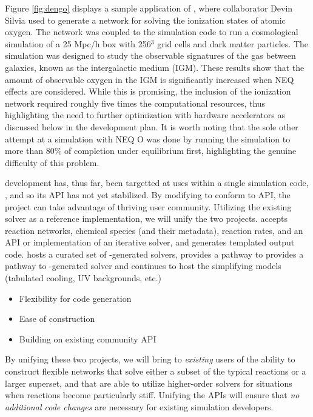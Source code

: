 Figure \ref{fig:dengo} displays a sample application of \dengo{}, where
collaborator Devin Silvia used \dengo{} to generate a network for solving
the ionization states of atomic oxygen.  The network was coupled to
the \enzo{} simulation code to run a cosmological simulation of a 25
Mpc/h box with 256$^{3}$ grid cells and dark matter particles.  The
simulation was designed to study the observable signatures of the gas
between galaxies, known as the intergalactic medium (IGM).  These
results show that the amount of observable oxygen in the IGM is
significantly increased when NEQ effects are considered.
While this is promising, the inclusion of the ionization network
required roughly five times the computational resources, thus
highlighting the need to further optimization with hardware
accelerators as discussed below in the development plan.  It is worth
noting that the sole other attempt at a simulation with NEQ
O \citep{2016MNRAS.460.2157O} was done by running the
simulation to more than 80\% of completion under equilibrium first,
highlighting the genuine difficulty of this problem.

\dengo{} development has, thus far, been targetted at uses within a
single simulation code, \enzo{}, and so its API has not yet
stabilized.  By modifying \dengo{} to conform to  API, the
\dengo{} project can take advantage of  thriving user
community. Utilizing the existing \grackle{}
solver as a reference implementation, we will unify the two projects.
\dengo{} accepts reaction networks, chemical species (and their
metadata), reaction rates, and an API or implementation of an
iterative solver, and generates templated output code.  \grackle{}
hosts a curated set of \dengo{}-generated solvers, provides a pathway
to 
provides a pathway to \dengo{}-generated solver and continues to host
the simplifying models (tabulated cooling, UV backgrounds, etc.) 

\begin{itemize}
\item Flexibility for code generation
\item Ease of construction
\item Building on existing community API
\end{itemize}

By unifying these two projects, we will bring to \textit{existing} users of
\grackle{} the ability to construct flexible networks that solve either a subset
of the typical reactions or a larger superset, and that are able to utilize
higher-order solvers for situations when reactions become particularly stiff.
Unifying the APIs will ensure that \textit{no additional code changes} are
necessary for existing simulation developers.
